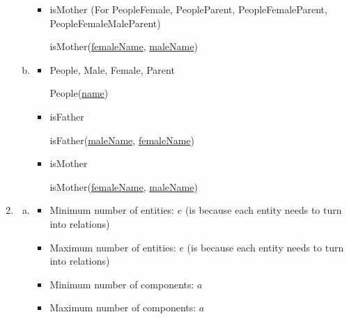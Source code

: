 \documentclass[12pt]{article}
\begin{document}
\begin{enumerate}[1.]
\begin{enumerate}[a)]
\begin{itemize}
            \bigskip

            \item isMother (For PeopleFemale, PeopleParent, PeopleFemaleParent,\\ PeopleFemaleMaleParent)

            \bigskip

            \quad isMother(\underline{femaleName}, \underline{maleName})

            \bigskip
        \end{itemize}

        \item

        \begin{itemize}
            \item People, Male, Female, Parent

            \bigskip

            \quad People(\underline{name})

            \bigskip

            \item isFather

            \bigskip

            \quad isFather(\underline{maleName}, \underline{femaleName})

            \bigskip

            \item isMother

            \bigskip

            \quad isMother(\underline{femaleName}, \underline{maleName})

            \bigskip
        \end{itemize}
    \end{enumerate}

    \item

    \begin{enumerate}[a)]
        \item

        \begin{itemize}
            \item Minimum number of entities: $e$ (is because each entity needs to turn into relations)
            \item Maximum number of entities: $e$ (is because each entity needs to turn into relations)
            \item Minimum number of components: $a$
            \item Maximum number of components: $a$
        \end{itemize}


\end{enumerate}
\end{enumerate}
\end{document}
